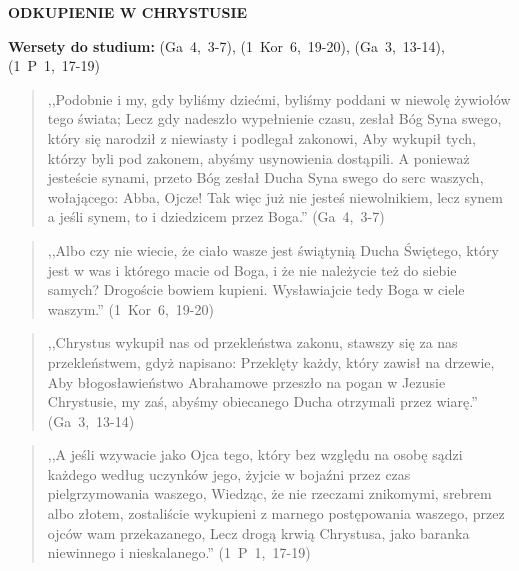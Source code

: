 \documentclass[10pt,a4paper,oneside]{article}
\begin{document}
\centerline{\textbf{\MakeUppercase{Odkupienie w Chrystusie}}}
\begin{center}
\textbf{Wersety do studium:} \mbox{(Ga 4, 3-7)}, \mbox{(1 Kor 6, 19-20)}, \mbox{(Ga 3, 13-14)}, \mbox{(1 P 1, 17-19)}
\end{center}
\begin{quote}
,,Podobnie i my, gdy byliśmy dziećmi, byliśmy poddani w niewolę żywiołów tego świata; Lecz gdy nadeszło wypełnienie czasu, zesłał Bóg Syna swego, który się narodził z niewiasty i podlegał zakonowi, Aby wykupił tych, którzy byli pod zakonem, abyśmy usynowienia dostąpili. A ponieważ jesteście synami, przeto Bóg zesłał Ducha Syna swego do serc waszych, wołającego: Abba, Ojcze! Tak więc już nie jesteś niewolnikiem, lecz synem a jeśli synem, to i dziedzicem przez Boga.'' \mbox{(Ga 4, 3-7)}
\end{quote}
\begin{quote}
,,Albo czy nie wiecie, że ciało wasze jest świątynią Ducha Świętego, który jest w was i którego macie od Boga, i że nie należycie też do siebie samych? Drogoście bowiem kupieni. Wysławiajcie tedy Boga w ciele waszym.'' \mbox{(1 Kor 6, 19-20)}
\end{quote}
\begin{quote}
,,Chrystus wykupił nas od przekleństwa zakonu, stawszy się za nas przekleństwem, gdyż napisano: Przeklęty każdy, który zawisł na drzewie, Aby błogosławieństwo Abrahamowe przeszło na pogan w Jezusie Chrystusie, my zaś, abyśmy obiecanego Ducha otrzymali przez wiarę.'' \mbox{(Ga 3, 13-14)}
\end{quote}
\begin{quote}
,,A jeśli wzywacie jako Ojca tego, który bez względu na osobę sądzi każdego według uczynków jego, żyjcie w bojaźni przez czas pielgrzymowania waszego, Wiedząc, że nie rzeczami znikomymi, srebrem albo złotem, zostaliście wykupieni z marnego postępowania waszego, przez ojców wam przekazanego, Lecz drogą krwią Chrystusa, jako baranka niewinnego i nieskalanego.'' \mbox{(1 P 1, 17-19)}
\end{quote}
\end{document}
